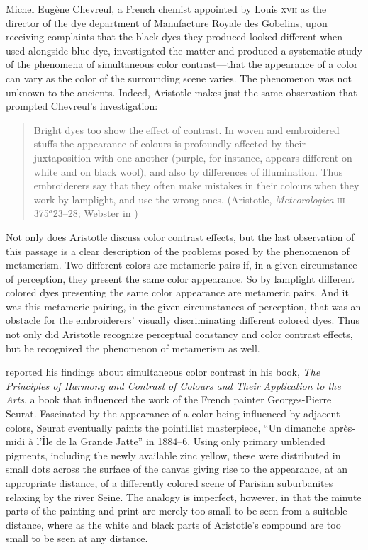 Michel Eugène Chevreul, a French chemist appointed by Louis \textsc{xvii} as the director of the dye department of Manufacture Royale des Gobelins, upon receiving complaints that the black dyes they produced looked different when used alongside blue dye, investigated the matter and produced a systematic study of the phenomena of simultaneous color contrast---that the appearance of a color can vary as the color of the surrounding scene varies. The phenomenon was not unknown to the ancients. Indeed, Aristotle makes just the same observation that prompted Chevreul's investigation: 
\begin{quote}
	Bright dyes too show the effect of contrast. In woven and embroidered stuffs the appearance of colours is profoundly affected by their juxtaposition with one another (purple, for instance, appears different on white and on black wool), and also by differences of illumination. Thus embroiderers say that they often make mistakes in their colours when they work by lamplight, and use the wrong ones. (Aristotle, \emph{Meteorologica} \textsc{iii} 375\( ^{a} \)23--28; Webster in \citealt[61]{Barnes:1984uq})
\end{quote}
Not only does Aristotle discuss color contrast effects, but the last observation of this passage is a clear description of the problems posed by the phenomenon of metamerism. Two different colors are metameric pairs if, in a given circumstance of perception, they present the same color appearance. So by lamplight different colored dyes presenting the same color appearance are metameric pairs. And it was this metameric pairing, in the given circumstances of perception, that was an obstacle for the embroiderers' visually discriminating different colored dyes. Thus not only did Aristotle recognize perceptual constancy and color contrast effects, but he recognized the phenomenon of metamerism as well.

\citet{Chevreul:1855kx} reported his findings about simultaneous color contrast in his book, \emph{The Principles of Harmony and Contrast of Colours and Their Application to the Arts}, a book that influenced the work of the French painter Georges-Pierre Seurat. Fascinated by the appearance of a color being influenced by adjacent colors, Seurat eventually paints the pointillist masterpiece, “Un dimanche apr\`{e}s-midi \`{a} l'\^{I}le de la Grande Jatte” in 1884--6. Using only primary unblended pigments, including the newly available zinc yellow, these were distributed in small dots across the surface of the canvas giving rise to the appearance, at an appropriate distance, of a differently colored scene of Parisian suburbanites relaxing by the river Seine. The analogy is imperfect, however, in that the minute parts of the painting and print are merely too small to be seen from a suitable distance, where as the white and black parts of Aristotle's compound are too small to be seen at any distance.

